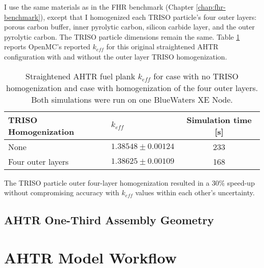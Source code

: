 I use the same materials as in the \gls{FHR} benchmark (Chapter \ref{chap:fhr-benchmark}), 
except that I homogenized each \gls{TRISO} particle's four outer layers: 
porous carbon buffer, inner pyrolytic carbon, silicon carbide layer, and the 
outer pyrolytic carbon. 
The \gls{TRISO} particle dimensions remain the same.
Table \ref{tab:keff_triso} reports OpenMC's reported $k_{eff}$ for this original 
straightened \gls{AHTR} configuration with and without the outer layer \gls{TRISO} 
homogenization.
\begin{table}[]
    \centering
    \onehalfspacing
    \caption{Straightened \acrfull{AHTR} fuel plank $k_{eff}$ for case with 
    no \gls{TRISO} homogenization and case with homogenization of the four outer 
    layers. Both simulations were run on one BlueWaters XE Node.}
	\label{tab:keff_triso}
    \footnotesize
    \begin{tabular}{llc}
    \hline 
    \textbf{TRISO Homogenization}& \textbf{$k_{eff}$} & \textbf{Simulation time [s]}  \\
    \hline 
    None & $1.38548 \pm 0.00124$ & 233\\ 
    Four outer layers & $1.38625 \pm 0.00109$ & 168\\ 
    \hline
    \end{tabular}
\end{table}
The \gls{TRISO} particle outer four-layer homogenization resulted in a $30\%$ 
speed-up without compromising accuracy with $k_{eff}$ values within each 
other's uncertainty.


\subsection{AHTR One-Third Assembly Geometry}

\section{AHTR Model Workflow}

